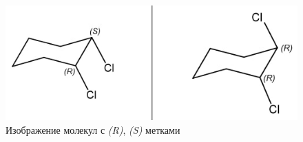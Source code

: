 \begin{figure}[ht!] 
	\center
	\includegraphics [scale=0.68] {my_folder/images/rs}
	\caption{Изображение молекул с \textit{(R)}, \textit{(S)} метками \cite{stereochem}} 
	\label{fig:rs}  
\end{figure}




